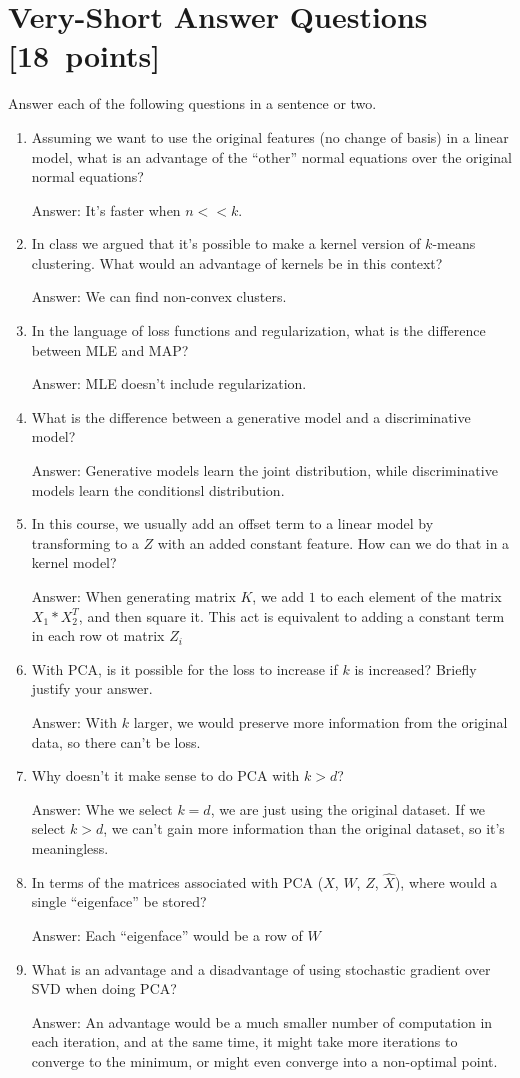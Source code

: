 \documentclass{article}
\newcommand{\blu}[1]{{\textcolor{blu}{#1}}}
\newcommand{\gre}[1]{\textcolor{gre}{#1}}
\newcommand\ans[1]{\par\gre{Answer: #1}}
\let\ask\blu
\newcommand\pts[1]{\textcolor{pointscolour}{[#1~points]}}
\begin{document}
\section{Very-Short Answer Questions \pts{18}}
\ask{Answer each of the following questions in a sentence or two.}
\begin{enumerate}
\item Assuming we want to use the original features (no change of basis) in a linear model, what is an advantage of the ``other'' normal equations over the original normal equations?
\ans{It's faster when $n << k$.}
\item In class we argued that it's possible to make a kernel version of $k$-means clustering. What would an advantage of kernels be in this context?
\ans{We can find non-convex clusters.}

\item In the language of loss functions and regularization, what is the difference between MLE and MAP?
\ans{MLE doesn't include regularization.}
\item What is the difference between a generative model and a discriminative model?
\ans{Generative models learn the joint distribution, while discriminative models learn the conditionsl distribution. }
\item In this course, we usually add an offset term to a linear model by transforming to a $Z$ with an added constant feature. How can we do that in a kernel model?
\ans{When generating matrix $K$, we add $1$ to each element of the matrix $X_1 * X_2^T$, and then square it. This act is equivalent to adding a constant term in each row ot matrix $Z_i$}

\item With PCA, is it possible for the loss to increase if $k$ is increased? Briefly justify your answer.
\ans{With $k$ larger, we would preserve more information from the original data, so there can't be loss.}


\item Why doesn't it make sense to do PCA with $k > d$?
\ans{Whe we select $k = d$, we are just using the original dataset. If we select $k > d$, we can't gain more information than the original dataset, so it's meaningless. }

\item In terms of the matrices associated with PCA ($X$, $W$, $Z$, $\hat{X}$), where would a single ``eigenface'' be stored?
\ans{Each ``eigenface'' would be a row of $W$}
\item What is an advantage and a disadvantage of using stochastic gradient over SVD when doing PCA?
\ans{An advantage would be a much smaller number of computation in each iteration, and at the same time, it might take more iterations to converge to the minimum, or might even converge into a non-optimal point. }
\end{enumerate}
\end{document}
